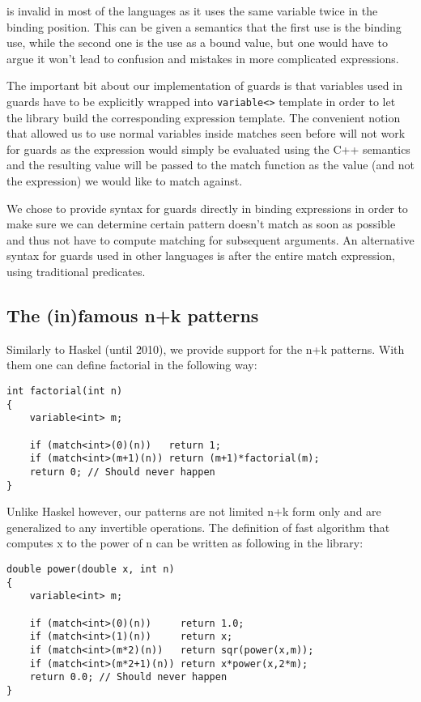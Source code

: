 \documentclass[submission,copyright]{eptcs}
\DeclareRobustCommand{\code}[1]{{\lstinline[breaklines=false]{#1}}}
\begin{document}
is invalid in most of the languages as it uses the same variable twice in the 
binding position. This can be given a semantics that the first use is the 
binding use, while the second one is the use as a bound value, but one would 
have to argue it won't lead to confusion and mistakes in more complicated 
expressions.

The important bit about our implementation of guards is that variables used in 
guards have to be explicitly wrapped into \code{variable<>} template in order to let 
the library build the corresponding expression template. The convenient notion 
that allowed us to use normal variables inside matches seen before will not work 
for guards as the expression would simply be evaluated using the C++ semantics 
and the resulting value will be passed to the match function as the value (and 
not the expression) we would like to match against.

We chose to provide syntax for guards directly in binding expressions in order 
to make sure we can determine certain pattern doesn't match as soon as possible 
and thus not have to compute matching for subsequent arguments. An alternative 
syntax for guards used in other languages is after the entire match expression, 
using traditional predicates.

\subsection{The (in)famous n+k patterns}

Similarly to Haskel (until 2010), we provide support for the n+k patterns. With 
them one can define factorial in the following way:

\begin{lstlisting}
int factorial(int n)
{
    variable<int> m;

    if (match<int>(0)(n))   return 1;
    if (match<int>(m+1)(n)) return (m+1)*factorial(m);
    return 0; // Should never happen
}
\end{lstlisting}

Unlike Haskel however, our patterns are not limited n+k form only and are 
generalized to any invertible operations. The definition of fast algorithm that 
computes x to the power of n can be written as following in the library:

\begin{lstlisting}
double power(double x, int n)
{
    variable<int> m;

    if (match<int>(0)(n))     return 1.0;
    if (match<int>(1)(n))     return x;
    if (match<int>(m*2)(n))   return sqr(power(x,m));
    if (match<int>(m*2+1)(n)) return x*power(x,2*m);
    return 0.0; // Should never happen
}
\end{lstlisting}
\end{document}
